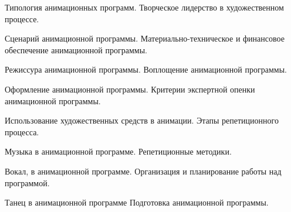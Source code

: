 \documentclass[
	14pt,
	a4paper,
	]
	{scrartcl}
\begin{document}
\shapk
{}
\setcounter{zad}{0}

\vfill
\z Типология анимационных программ.
 \vfill
\z Творческое лидерство в художественном процессе.  \vfill

\vfill

\newpage


\shapk
{}
\setcounter{zad}{0}

\vfill
\z Сценарий анимационной программы.
 \vfill
\z Материально-техническое и финансовое обеспечение анимационной программы.
 \vfill

\vfill

\newpage


\shapk
{}
\setcounter{zad}{0}

\vfill
\z Режиссура анимационной программы.
 \vfill
\z Воплощение анимационной программы.
 \vfill

\vfill

\newpage


\shapk
{}
\setcounter{zad}{0}

\vfill
\z Оформление анимационной программы.
 \vfill
\z Критерии экспертной опенки анимационной программы.
 \vfill

\vfill

\newpage


\shapk
{}
\setcounter{zad}{0}

\vfill
\z Использование художественных средств в анимации.
 \vfill
\z Этапы репетиционного процесса.
 \vfill

\vfill

\newpage


\shapk
{}
\setcounter{zad}{0}

\vfill
\z Музыка в анимационной программе.
 \vfill
\z Репетиционные методики.
 \vfill

\vfill

\newpage


\shapk
{}
\setcounter{zad}{0}

\vfill
\z Вокал, в анимационной программе.
 \vfill
\z Организация и планирование работы над программой.
 \vfill

\vfill

\newpage


\shapk
{}
\setcounter{zad}{0}

\vfill
\z Танец в анимационной программе
 \vfill
\z Подготовка анимационной программы.
 \vfill
\end{document}

